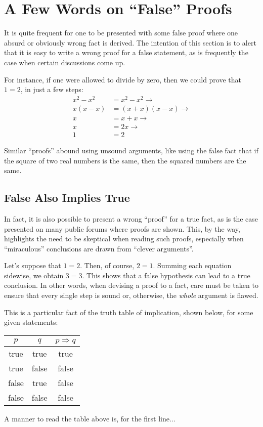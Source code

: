 \section{A Few Words on ``False'' Proofs}

It is quite frequent for one to be presented with some false proof where
one absurd or obviously wrong fact is derived. The intention of this
section is to alert that it is easy to write a wrong proof for a false
statement, as is frequently the case when certain discussions come up.

For instance, if one were allowed to divide by zero, then we could prove
that $1 = 2$, in just a few steps:
\begin{align}
  x^2 - x^2 &= x^2 - x^2 \rightarrow \\
  x(x-x) &= (x+x)(x-x) \rightarrow \\
  x &= x+x \rightarrow \\
  x &= 2x \rightarrow \\
  1 &= 2
\end{align}

Similar ``proofs'' abound using unsound arguments, like using the false
fact that if the square of two real numbers is the same, then the
squared numbers are the same.

\subsection{False Also Implies True}

In fact, it is also possible to present a wrong ``proof'' for a true
fact, as is the case presented on many public forums where proofs are
shown. This, by the way, highlights the need to be skeptical when
reading such proofs, especially when ``miraculous'' conclusions are
drawn from ``clever arguments''.

Let's suppose that $1 = 2$. Then, of course, $2 = 1$. Summing each
equation sidewise, we obtain $3 = 3$. This shows that a false hypothesis
can lead to a true conclusion. In other words, when devising a proof to
a fact, care must be taken to ensure that every single step is sound or,
otherwise, the \emph{whole} argument is flawed.

This is a particular fact of the truth table of implication, shown
below, for some given statements:
\begin{tabular}{c|c|c}
  $p$ & $q$ & $p \Rightarrow q$\\
  \hline
  true & true & true\\
  true & false & false\\
  false & true & false\\
  false & false & false
\end{tabular}

A manner to read the table above is, for the first line...